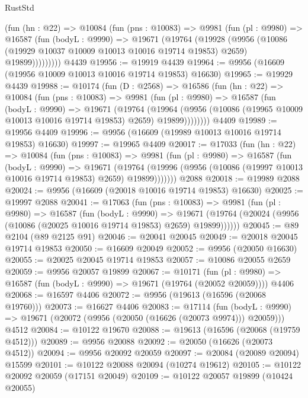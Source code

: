 \begin{lexlean}{RustStd}
\begin{coremodule}
        (fun (hn : @22) =>
        @10084
          (fun (pns : @10083) =>
          @9981
            (fun (pl : @9980) =>
            @16587
              (fun (bodyL : @9990) =>
              @19671
                (@19764
                  (@19928
                    (@9956
                      (@10086 (@19929 @10037 @10009 @10013 @10016 @19714 @19853) @2659)
                      @19899)))))))))
    @4439
@19956 := @19919 @4439
@19964 := @9956 (@16609 (@19956 @10009 @10013 @10016 @19714 @19853) @16630)
@19965 := @19929 @4439
@19988 := @10174
    (fun (D : @2568) =>
    @16586
      (fun (hn : @22) =>
      @10084
        (fun (pns : @10083) =>
        @9981
          (fun (pl : @9980) =>
          @16587
            (fun (bodyL : @9990) =>
            @19671
              (@19764
                (@19964
                  (@9956 (@10086 (@19965 @10009 @10013 @10016 @19714 @19853) @2659) @19899))))))))
    @4409
@19989 := @19956 @4409
@19996 := @9956 (@16609 (@19989 @10013 @10016 @19714 @19853) @16630)
@19997 := @19965 @4409
@20017 := @17033
    (fun (hn : @22) =>
    @10084
      (fun (pns : @10083) =>
      @9981
        (fun (pl : @9980) =>
        @16587
          (fun (bodyL : @9990) =>
          @19671
            (@19764 (@19996 (@9956 (@10086 (@19997 @10013 @10016 @19714 @19853) @2659) @19899)))))))
    @2088
@20018 := @19989 @2088
@20024 := @9956 (@16609 (@20018 @10016 @19714 @19853) @16630)
@20025 := @19997 @2088
@20041 := @17063
    (fun (pns : @10083) =>
    @9981
      (fun (pl : @9980) =>
      @16587
        (fun (bodyL : @9990) =>
        @19671 (@19764 (@20024 (@9956 (@10086 (@20025 @10016 @19714 @19853) @2659) @19899))))))
@20045 := @89 @2104 (@89 @2125 @91)
@20046 := @20041 @20045
@20049 := @20018 @20045 @19714 @19853
@20050 := @16609 @20049
@20052 := @9956 (@20050 @16630)
@20055 := @20025 @20045 @19714 @19853
@20057 := @10086 @20055 @2659
@20059 := @9956 @20057 @19899
@20067 := @10171
    (fun (pl : @9980) => @16587 (fun (bodyL : @9990) => @19671 (@19764 (@20052 @20059))))
    @4406
@20068 := @16597 @4406
@20072 := @9956 (@19613 (@16596 (@20068 @19760)))
@20073 := @16627 @4406
@20083 := @17114
    (fun (bodyL : @9990) => @19671 (@20072 (@9956 (@20050 (@16626 (@20073 @9974))) @20059)))
    @4512
@20084 := @10122 @19670
@20088 := @19613 (@16596 (@20068 (@19759 @4512)))
@20089 := @9956 @20088
@20092 := @20050 (@16626 (@20073 @4512))
@20094 := @9956 @20092 @20059
@20097 := @20084 (@20089 @20094) @15599
@20101 := @10122 @20088 @20094 (@10274 @19612)
@20105 := @10122 @20092 @20059 (@17151 @20049)
@20109 := @10122 @20057 @19899 (@10424 @20055)

\end{coremodule}
\end{lexlean}
